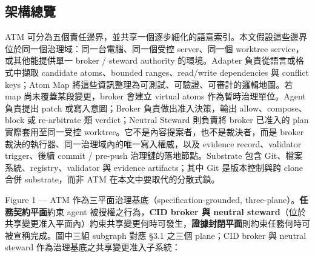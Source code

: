 \documentclass[a4paper,fontset=none]{ctexart}
\begin{document}
\medskip

\subsection{架構總覽}

ATM 可分為五個責任邊界，並共享一個逐步細化的語意索引。本文假設這些邊界位於同一個治理域：同一台電腦、同一個受控 server、同一個 worktree service，或其他能提供單一 broker / steward authority 的環境。Adapter 負責從語言或格式中擷取 candidate atoms、bounded ranges、read/write dependencies 與 conflict keys；Atom Map 將這些資訊整理為可測試、可驗證、可審計的邏輯地圖。若 map 尚未覆蓋某段變更，broker 會建立 virtual atoms 作為暫時治理單位。Agent 負責提出 patch 或寫入意圖；Broker 負責做出准入決策，輸出 allow、compose、block 或 re-arbitrate 類 verdict；Neutral Steward 則負責將 broker 已准入的 plan 實際套用至同一受控 worktree。它不是內容提案者，也不是裁決者，而是 broker 裁決的執行器、同一治理域內的唯一寫入權威，以及 evidence record、validator trigger、後續 commit / pre-push 治理鏈的落地節點。Substrate 包含 Git、檔案系統、registry、validator 與 evidence artifacts；其中 Git 是版本控制與跨 clone 合併 substrate，而非 ATM 在本文中要取代的分散式鎖。

Figure 1 --- ATM 作為三平面治理基底（specification-grounded, three-plane）。\textbf{任務契約平面}約束 agent 被授權之行為，\textbf{CID broker 與 neutral steward}（位於共享變更准入平面內）約束共享變更何時可發生，\textbf{證據封閉平面}則約束任務何時可被宣稱完成。圖中三組 subgraph 對應 §3.1 之三個 plane；CID broker 與 neutral steward 作為治理基底之共享變更准入子系統：
\end{document}
